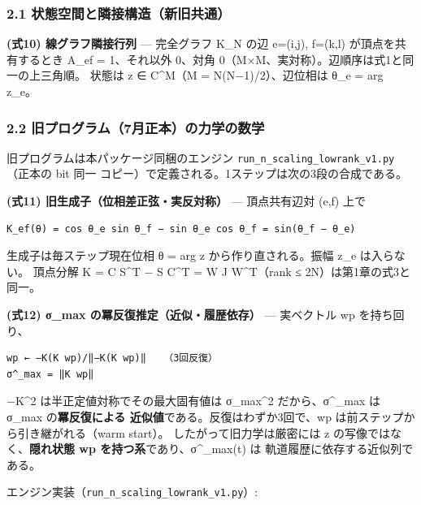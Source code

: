 \documentclass[
  a4paper,
]{ltjsarticle}
\begin{document}
\subsubsection{2.1
状態空間と隣接構造（新旧共通）}\label{ux72b6ux614bux7a7aux9593ux3068ux96a3ux63a5ux69cbux9020ux65b0ux65e7ux5171ux901a}

\textbf{(式10) 線グラフ隣接行列} --- 完全グラフ K\_N の辺 e=(i,j),
f=(k,l) が頂点を共有するとき A\_ef = 1、それ以外 0、対角
0（M×M、実対称）。辺順序は式1と同一の上三角順。 状態は z ∈ C\^{}M（M =
N(N−1)/2）、辺位相は θ\_e = arg z\_e。

\subsubsection{2.2
旧プログラム（7月正本）の力学の数学}\label{ux65e7ux30d7ux30edux30b0ux30e9ux30e07ux6708ux6b63ux672cux306eux529bux5b66ux306eux6570ux5b66}

旧プログラムは本パッケージ同梱のエンジン
\texttt{run\_n\_scaling\_lowrank\_v1.py}（正本の bit 同一
コピー）で定義される。1ステップは次の3段の合成である。

\textbf{(式11) 旧生成子（位相差正弦・実反対称）} --- 頂点共有辺対 (e,f)
上で

\begin{verbatim}
K_ef(θ) = cos θ_e sin θ_f − sin θ_e cos θ_f = sin(θ_f − θ_e)
\end{verbatim}

生成子は毎ステップ現在位相 θ = arg z から作り直される。振幅
\textbar z\_e\textbar{} は入らない。 頂点分解 K = C S\^{}T − S C\^{}T =
W J W\^{}T（rank ≤ 2N）は第1章の式3と同一。

\textbf{(式12) σ\_max の冪反復推定（近似・履歴依存）} --- 実ベクトル wp
を持ち回り、

\begin{verbatim}
wp ← −K(K wp)/‖−K(K wp)‖   （3回反復）
σ^_max = ‖K wp‖
\end{verbatim}

−K\^{}2 は半正定値対称でその最大固有値は σ\_max\^{}2 だから、σ\^{}\_max
は σ\_max の\textbf{冪反復による 近似値}である。反復はわずか3回で、wp
は前ステップから引き継がれる（warm start）。 したがって旧力学は厳密には
z の写像ではなく、\textbf{隠れ状態 wp を持つ系}であり、σ\^{}\_max(t) は
軌道履歴に依存する近似列である。

エンジン実装（\texttt{run\_n\_scaling\_lowrank\_v1.py}）:
\end{document}
